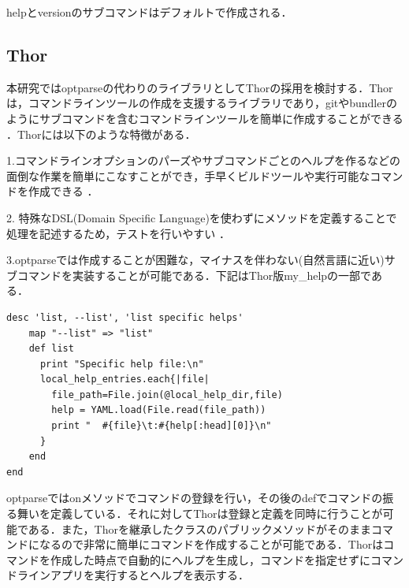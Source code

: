 helpとversionのサブコマンドはデフォルトで作成される．

\subsection{Thor}\label{thor}

本研究ではoptparseの代わりのライブラリとしてThorの採用を検討する．Thorは，コマンドラインツールの作成を支援するライブラリであり，gitやbundlerのようにサブコマンドを含むコマンドラインツールを簡単に作成することができる
\cite{koichiro}．Thorには以下のような特徴がある．

1.コマンドラインオプションのパーズやサブコマンドごとのヘルプを作るなどの面倒な作業を簡単にこなすことができ，手早くビルドツールや実行可能なコマンドを作成できる
\cite{hibariya}．

2. 特殊なDSL(Domain Specific
Language)を使わずにメソッドを定義することで処理を記述するため，テストを行いやすい
\cite{hibariya}．

3.optparseでは作成することが困難な，マイナスを伴わない(自然言語に近い)サブコマンドを実装することが可能である．下記はThor版my\_helpの一部である．

\begin{screen}
{\small
\begin{verbatim}
desc 'list, --list', 'list specific helps'
    map "--list" => "list"
    def list
      print "Specific help file:\n"
      local_help_entries.each{|file|
        file_path=File.join(@local_help_dir,file)
        help = YAML.load(File.read(file_path))
        print "  #{file}\t:#{help[:head][0]}\n"
      }
    end
end
\end{verbatim}}
\end{screen}


optparseではonメソッドでコマンドの登録を行い，その後のdefでコマンドの振る舞いを定義している．それに対してThorは登録と定義を同時に行うことが可能である．また，Thorを継承したクラスのパブリックメソッドがそのままコマンドになるので非常に簡単にコマンドを作成することが可能である．Thorはコマンドを作成した時点で自動的にヘルプを生成し，コマンドを指定せずにコマンドラインアプリを実行するとヘルプを表示する．

